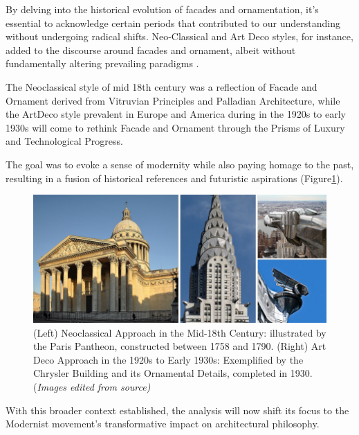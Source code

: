 
By delving into the historical evolution of facades and ornamentation, it's essential to acknowledge certain periods that contributed to our understanding without undergoing radical shifts.
Neo-Classical and Art Deco styles, for instance, added to the discourse around facades and ornament, albeit without fundamentally altering prevailing paradigms .

The Neoclassical style of mid 18th century was a reflection of Facade and Ornament derived from Vitruvian Principles and Palladian Architecture, while the ArtDeco style prevalent in Europe and America during in the 1920s to early 1930s will come to rethink Facade and Ornament through the Prisms of Luxury and Technological Progress.

The goal was to evoke a sense of modernity while also paying homage to the past, resulting in a fusion of historical references and futuristic aspirations (Figure\ref{fig:NeoclassicArtDeco}).

     \begin{figure}[htb]
          \centering
          \includegraphics[width= \linewidth]{Images/NeoclassicArtDeco}
          \caption{(Left) Neoclassical Approach in the Mid-18th Century: illustrated by the Paris Pantheon, constructed between 1758 and 1790. (Right) Art Deco Approach in the 1920s to Early 1930s: Exemplified by the Chrysler Building and its Ornamental Details, completed in 1930. (\textit{Images edited from source)}}
          \label{fig:NeoclassicArtDeco}
        \end{figure}

With this broader context established, the analysis will now shift its focus to the Modernist movement's transformative impact on architectural philosophy.


